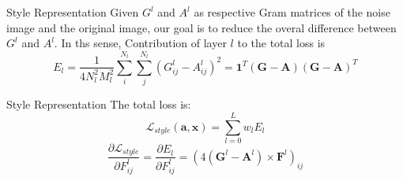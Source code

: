 \documentclass{beamer}
\begin{document}
\begin{frame}{Style Representation}
Given $G^l$ and $A^l$ as respective Gram matrices of the
noise image and the original image, our goal is to reduce the overal difference
between $G^l$ and $A^l$. In ths sense,
Contribution of layer $l$ to the total loss is
\begin{equation}
    E_l = \frac{1}{4N_l^2M_l^2} \sum_{i}^{N_l}\sum_{j}^{N_l}{(G^l_{ij} - A^l_{ij})^2}
    = \mathbf{1}^T(\mathbf{G} - \mathbf{A})(\mathbf{G} - \mathbf{A})^T
\end{equation}
\end{frame}
\begin{frame}{Style Representation}
The total loss is:
\begin{equation}
    \mathcal{L}_{style}(\mathbf{a}, \mathbf{x}) = \sum_{l=0}^L {w_l E_l }
\end{equation}
\begin{equation}
    \frac{\partial \mathcal{L}_{style}}{\partial F^l_{ij}} = \frac{\partial E_l}{\partial F^l_{ij}} =
    (4(\mathbf{G}^l - \mathbf{A}^l) \times \mathbf{F}^l)_{ij}
\end{equation}
\end{frame}
\end{document}
